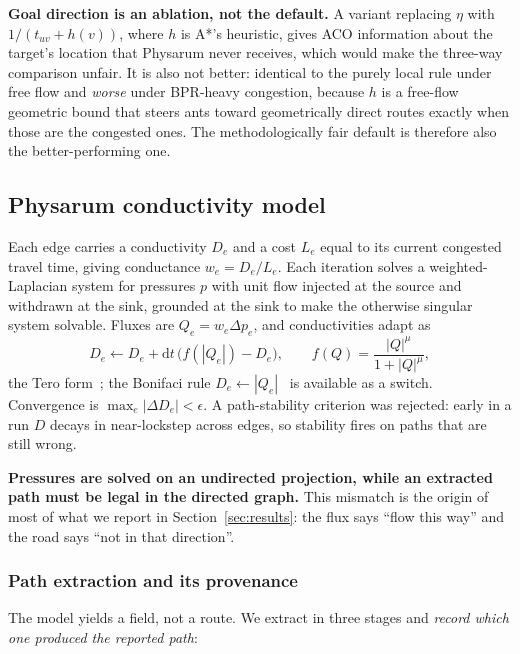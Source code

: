 \textbf{Goal direction is an ablation, not the default.} A variant replacing
$\eta$ with $1/(t_{uv} + h(v))$, where $h$ is A*'s heuristic, gives ACO
information about the target's location that Physarum never receives, which
would make the three-way comparison unfair. It is also not better: identical
to the purely local rule under free flow and \emph{worse} under BPR-heavy
congestion, because $h$ is a free-flow geometric bound that steers ants
toward geometrically direct routes exactly when those are the congested ones.
The methodologically fair default is therefore also the better-performing
one.

\subsection{Physarum conductivity model}

Each edge carries a conductivity $D_e$ and a cost $L_e$ equal to its current
congested travel time, giving conductance $w_e = D_e / L_e$. Each iteration
solves a weighted-Laplacian system for pressures $p$ with unit flow injected
at the source and withdrawn at the sink, grounded at the sink to make the
otherwise singular system solvable. Fluxes are $Q_e = w_e \Delta p_e$, and
conductivities adapt as
\begin{equation}
D_e \leftarrow D_e + \mathrm{d}t\,\bigl(f(|Q_e|) - D_e\bigr),
\qquad
f(Q) = \frac{|Q|^{\mu}}{1 + |Q|^{\mu}} ,
\end{equation}
the Tero form~\cite{tero2007mathematical}; the Bonifaci
rule $D_e \leftarrow |Q_e|$~\cite{bonifaci2012physarum} is available as a
switch. Convergence is $\max_e |\Delta D_e| < \epsilon$. A path-stability
criterion was rejected: early in a run $D$ decays in near-lockstep across
edges, so stability fires on paths that are still wrong.

\textbf{Pressures are solved on an undirected projection, while an extracted
path must be legal in the directed graph.} This mismatch is the origin of
most of what we report in Section~\ref{sec:results}: the flux says ``flow
this way'' and the road says ``not in that direction''.

\subsubsection{Path extraction and its provenance}
\label{sec:extraction}

The model yields a field, not a route. We extract in three stages and
\emph{record which one produced the reported path}:

